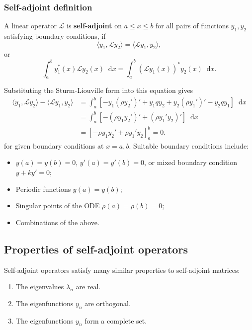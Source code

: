 \documentclass[12pt]{article}
\newcommand{\diff}{\mathop{}\!\mathrm{d}}
\theoremstyle{definition}
\theoremstyle{remark}
\begin{document}
\subsubsection{Self-adjoint definition}%
\label{subsub:self_adjoint_definition}

A linear operator $\mathcal{L}$ is \textbf{self-adjoint} on $a \leq x \leq b$ for all pairs of functions $y_1, y_2$ satisfying boundary conditions, if
\[
	\langle y_1, \mathcal{L}y_2 \rangle = \langle \mathcal{L}y_1, y_2 \rangle
,\]
or
\[
	\int_{a}^{b} y^{\ast}_1(x) \mathcal{L}y_2(x)\diff x = \int_{a}^{b} (\mathcal{L}y_1(x))^{\ast} y_2(x) \diff x
.\]

Substituting the Sturm-Liouville form into this equation gives
\begin{align*}
	\langle y_1, \mathcal{L}y_2 \rangle - \langle \mathcal{L}y_1, y_2 \rangle &= \int_{a}^{b} [-y_1(\rho y_2')' + y_1qy_2 + y_2(\rho y_1')' - y_2 qy_1]\diff x \\
										  &= \int_{a}^{b} [-(\rho y_1 y_2')' + (\rho y_1' y_2)']\diff x \\
										  &= \left[ - \rho y_1 y_2' + \rho y_1' y_2 \right]_{a}^{b} = 0.
\end{align*}
for given boundary conditions at $x = a, b$. Suitable boundary conditions include:
\begin{itemize}
	\item $y(a) = y(b) = 0$, $y'(a) = y'(b) = 0$, or mixed boundary condition $y + ky' = 0$;
	\item Periodic functions $y(a) = y(b)$;
	\item Singular points of the ODE $\rho(a) = \rho(b) = 0$;
	\item Combinations of the above.
\end{itemize}

\subsection{Properties of self-adjoint operators}%
\label{sub:properties_of_self_adjoint_operators}

Self-adjoint operators satisfy many similar properties to self-adjoint matrices:
\begin{enumerate}[1.]
	\item The eigenvalues $\lambda_n$ are real.
	\item The eigenfunctions $y_n$ are orthogonal.
	\item The eigenfunctions $y_n$ form a complete set.
\end{enumerate}


\newpage

\printindex
\end{document}
